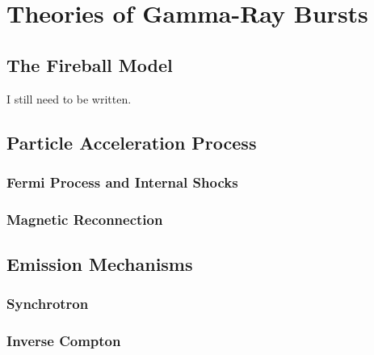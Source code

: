 \chapter{Theories of Gamma-Ray Bursts}
\label{ch:theoryGRB}

\section{The Fireball Model}

I still need to be written.

\subsection{}


\section{Particle Acceleration Process}

\subsection{Fermi Process and Internal Shocks}

\subsection{Magnetic Reconnection}


\section{Emission Mechanisms}

\subsection{Synchrotron}

\subsection{Inverse Compton}







